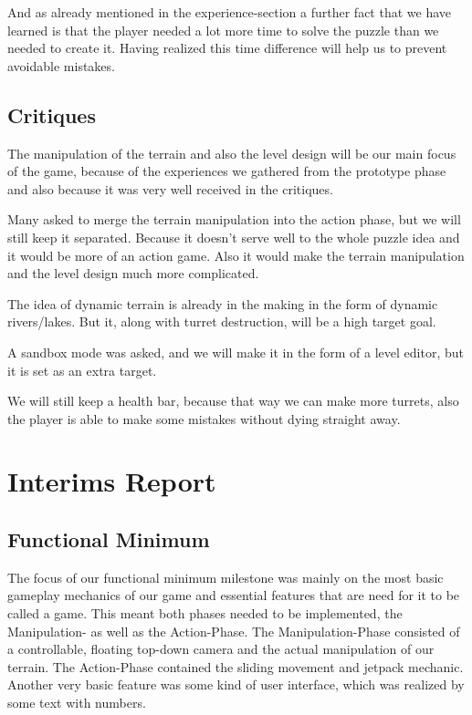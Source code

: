 \documentclass[12pt, letterpaper]{scrartcl}
\begin{document}
	And as already mentioned in the experience-section a further fact that we have learned is that the player needed a lot more time to solve the puzzle than we needed to create it. Having realized this time difference will help us to prevent avoidable mistakes.
	
	\subsection{Critiques}
	The manipulation of the terrain and also the level design will be our main focus of the game, because of the experiences we gathered from the prototype phase and also because it was very well received in the critiques.
	
	Many asked to merge the terrain manipulation into the action phase, but we will still keep it separated. Because it doesn't serve well to the whole puzzle idea and it would be more of an action game. Also it would make the terrain manipulation and the level design much more complicated.
	
	The idea of dynamic terrain is already in the making in the form of dynamic rivers/lakes. But it, along with turret destruction, will be a high target goal.
	
	A sandbox mode was asked, and we will make it in the form of a level editor, but it is set as an extra target.
	
	We will still keep a health bar, because that way we can make more turrets, also the player is able to make some mistakes without dying straight away.
	
	\newpage
	\section{Interims Report}
	\subsection{Functional Minimum}
	\label{sec:functionalMinimum}
	The focus of our functional minimum milestone was mainly on the most basic gameplay mechanics of our game and essential features that are need for it to be called a game. This meant both phases needed to be implemented, the Manipulation- as well as the Action-Phase. The Manipulation-Phase consisted of a controllable, floating top-down camera and the actual manipulation of our terrain. The Action-Phase contained the sliding movement and jetpack mechanic. Another very basic feature was some kind of user interface, which was realized by some text with numbers.
	
\end{document}
